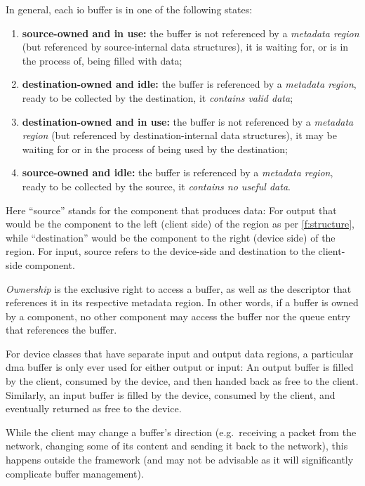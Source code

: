 \documentclass[a4paper,12pt]{report}
\newcommand{\Obj}[1]{\textsl{#1}}
\begin{document}
In general, each \gls{io} buffer is in one of the following states:
\begin{enumerate}
\item\label{st:so_u}\textbf{source-owned and in use:} the buffer is not referenced by a
 \Obj{metadata region} (but referenced by source-internal data structures),
  it is waiting for, or is in the process of, being filled with data;
\item\label{st:do_i} \textbf{destination-owned and idle:} the buffer
  is referenced by a \Obj{metadata
  region}, ready to be collected by the destination, it \emph{contains valid data};
\item\label{st:do_u} \textbf{destination-owned and in use:} the buffer is not referenced by a
  \Obj{metadata region} (but referenced by destination-internal data
  structures), it may be waiting for or in the process of being
  used by the destination;
\item\label{st:so_i} \textbf{source-owned and idle:} the buffer is referenced by a \Obj{metadata
  region}, ready to be collected by the source, it \emph{contains no useful data}.
\end{enumerate}
Here ``source'' stands for the component that produces data: For output
that would be the component to the left (client side) of the region as
per \autoref{f:structure}, while ``destination'' would be the
component to the right (device side) of the region.
For input, source refers to the device-side and destination to the
client-side component.

\emph{Ownership} is the exclusive right to access a buffer, as well as
the descriptor that references it in its respective metadata region. In other
words, if a buffer is owned by a component, no other component may
access the buffer nor the queue entry that references the buffer.

For device classes that have separate input and output data regions,
a particular \gls{dma} buffer is only ever used
for either output or input: An output buffer is filled by the client,
consumed by the device, and then handed back as free
to the client.  Similarly, an
input buffer is filled by the device, consumed by the client, and eventually
returned as free to the device.

While the client may change a buffer's direction (e.g.\
receiving a packet from the network, changing some of its content and
sending it back to the network), this happens outside the
framework (and may not be advisable as it will significantly
complicate buffer management).
\end{document}

